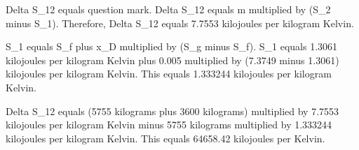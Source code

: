 Delta S_12 equals question mark.  
Delta S_12 equals m multiplied by (S_2 minus S_1). Therefore, Delta S_12 equals 7.7553 kilojoules per kilogram Kelvin.  

S_1 equals S_f plus x_D multiplied by (S_g minus S_f).  
S_1 equals 1.3061 kilojoules per kilogram Kelvin plus 0.005 multiplied by (7.3749 minus 1.3061) kilojoules per kilogram Kelvin.  
This equals 1.333244 kilojoules per kilogram Kelvin.  

Delta S_12 equals (5755 kilograms plus 3600 kilograms) multiplied by 7.7553 kilojoules per kilogram Kelvin minus 5755 kilograms multiplied by 1.333244 kilojoules per kilogram Kelvin.  
This equals 64658.42 kilojoules per Kelvin.